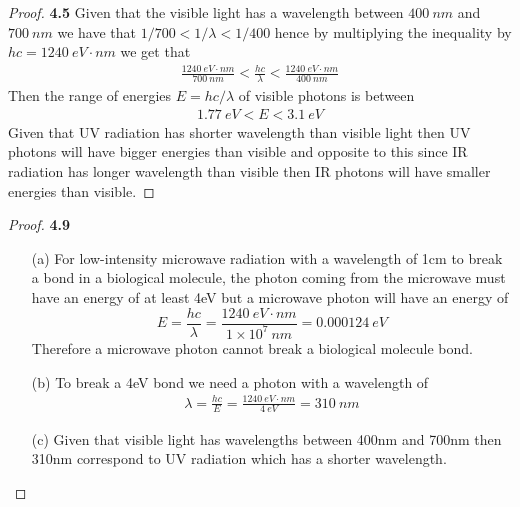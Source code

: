 \documentclass[11pt]{article}
\theoremstyle{definition}
\begin{document}
\cleardoublepage
\begin{proof}{\textbf{4.5}}
    Given that the visible light has a wavelength between $400~nm$ and $700~nm$
    we have that $1/700 < 1/\lambda < 1/400$ hence by multiplying
    the inequality by $hc = 1240~eV\cdot nm$ we get that
    \begin{align*}
        \frac{1240~eV\cdot nm}{700~nm}
        < \frac{hc}{\lambda}
        < \frac{1240~eV\cdot nm}{400~nm}
    \end{align*}
    Then the range of energies $E = hc/\lambda$ of visible photons is between
    \begin{align*}
        1.77~eV < E < 3.1~eV
    \end{align*}
    Given that UV radiation has shorter wavelength than visible light then UV
    photons will have bigger energies than visible and opposite to this
    since IR radiation has longer wavelength than visible then IR photons
    will have smaller energies than visible.
\end{proof}
\begin{proof}{\textbf{4.9}}
\begin{itemize}
    \item [(a)] For low-intensity microwave radiation with a wavelength of 1cm
    to break a bond in a biological molecule, the photon coming from
    the microwave must have an energy of at least 4eV but a microwave
    photon will have an energy of
    $$E = \frac{hc}{\lambda} = \frac{1240~eV\cdot nm}{1\times 10^7~nm} = 0.000124~eV$$
    Therefore a microwave photon cannot break a biological molecule bond.

    \item [(b)] To break a 4eV bond we need a photon with a wavelength of
    \begin{align*}
        \lambda = \frac{hc}{E} = \frac{1240~eV\cdot nm}{4~eV} = 310~nm
    \end{align*}
    
    \item [(c)] Given that visible light has wavelengths between 400nm and
    700nm then 310nm correspond to UV radiation which has a shorter wavelength.
\end{itemize}
\end{proof}
\cleardoublepage
\end{document}
